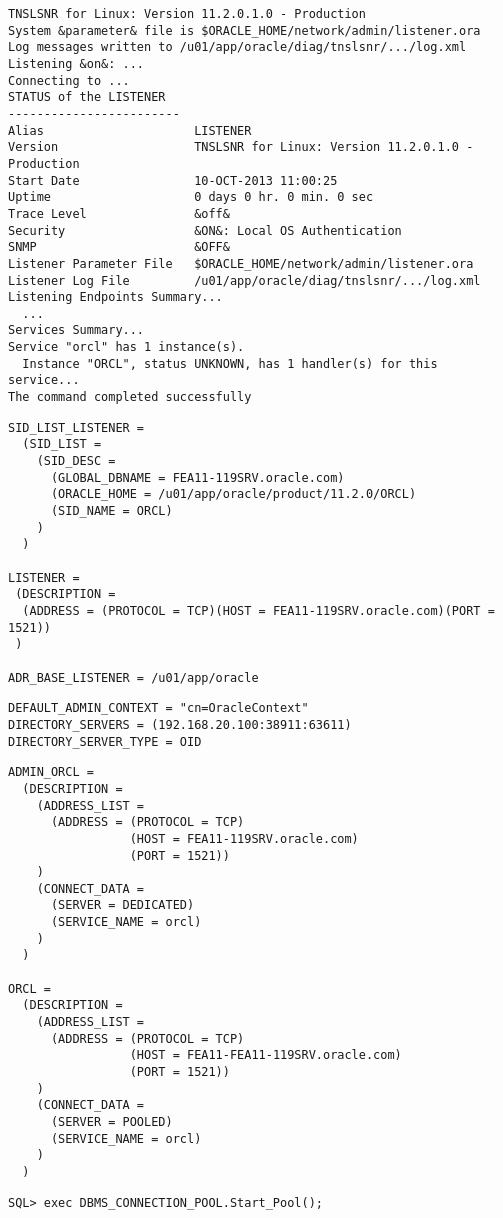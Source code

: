\begin{enumerate}
\begin{lstlisting}[language=terminal]
TNSLSNR for Linux: Version 11.2.0.1.0 - Production
System &parameter& file is $ORACLE_HOME/network/admin/listener.ora
Log messages written to /u01/app/oracle/diag/tnslsnr/.../log.xml
Listening &on&: ...
Connecting to ...
STATUS of the LISTENER
------------------------
Alias                     LISTENER
Version                   TNSLSNR for Linux: Version 11.2.0.1.0 - Production
Start Date                10-OCT-2013 11:00:25
Uptime                    0 days 0 hr. 0 min. 0 sec
Trace Level               &off&
Security                  &ON&: Local OS Authentication
SNMP                      &OFF&
Listener Parameter File   $ORACLE_HOME/network/admin/listener.ora
Listener Log File         /u01/app/oracle/diag/tnslsnr/.../log.xml
Listening Endpoints Summary...
  ...
Services Summary...
Service "orcl" has 1 instance(s).
  Instance "ORCL", status UNKNOWN, has 1 handler(s) for this service...
The command completed successfully
      \end{lstlisting}
\clearpage	  
    
      \begin{lstlisting}[caption={listener.ora},language=configfile]
SID_LIST_LISTENER =
  (SID_LIST =
    (SID_DESC =
      (GLOBAL_DBNAME = FEA11-119SRV.oracle.com)
      (ORACLE_HOME = /u01/app/oracle/product/11.2.0/ORCL)
      (SID_NAME = ORCL)
    )
  )

LISTENER =
 (DESCRIPTION =
  (ADDRESS = (PROTOCOL = TCP)(HOST = FEA11-119SRV.oracle.com)(PORT = 1521))
 )

ADR_BASE_LISTENER = /u01/app/oracle
      \end{lstlisting}
    
      \begin{lstlisting}[caption={ldap.ora},language=configfile]
DEFAULT_ADMIN_CONTEXT = "cn=OracleContext"
DIRECTORY_SERVERS = (192.168.20.100:38911:63611)
DIRECTORY_SERVER_TYPE = OID
      \end{lstlisting}
    
\clearpage
    
      \begin{lstlisting}[caption={tnsnames.ora},language=configfile]
ADMIN_ORCL =
  (DESCRIPTION =
    (ADDRESS_LIST =
      (ADDRESS = (PROTOCOL = TCP)
                 (HOST = FEA11-119SRV.oracle.com)
                 (PORT = 1521))
    )
    (CONNECT_DATA =
      (SERVER = DEDICATED)
      (SERVICE_NAME = orcl)
    )
  )

ORCL =
  (DESCRIPTION =
    (ADDRESS_LIST =
      (ADDRESS = (PROTOCOL = TCP)
                 (HOST = FEA11-FEA11-119SRV.oracle.com)
                 (PORT = 1521))
    )
    (CONNECT_DATA =
      (SERVER = POOLED)
      (SERVICE_NAME = orcl)
    )
  )
      \end{lstlisting}
      \begin{lstlisting}[caption={Connection Pooling aktivieren in SQL*Plus},language=oracle_sql] 
SQL> exec DBMS_CONNECTION_POOL.Start_Pool();
      \end{lstlisting}
  \end{enumerate}
